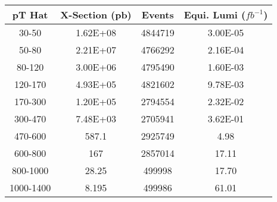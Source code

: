 \begin{table}
\centering

\begin{tabular}{|c|c|c|c|}
\hline
pT Hat &  X-Section (pb) & Events & Equi. Lumi ($fb^{-1}$) \\
\hline
\hline
  30-50   & \num{1.62E+08} & 4844719 & \num{3.00E-05} \\
  50-80   & \num{2.21E+07} & 4766292 & \num{2.16E-04} \\
 80-120   & \num{3.00E+06} & 4795490 & \num{1.60E-03} \\
120-170   & \num{4.93E+05} & 4821602 & \num{9.78E-03} \\
170-300   & \num{1.20E+05} & 2794554 & \num{2.32E-02} \\
300-470   & \num{7.48E+03} & 2705941 & \num{3.62E-01} \\
470-600   &         587.1  & 2925749 &           4.98 \\
600-800   &           167  & 2857014 &          17.11 \\
800-1000  &         28.25  &  499998 &          17.70 \\
1000-1400 &         8.195  &  499986 &          61.01 \\
\hline
\end{tabular}

\label{table_QCD_RunII_EventsIntegratedLuminsity}
\end{table} 
